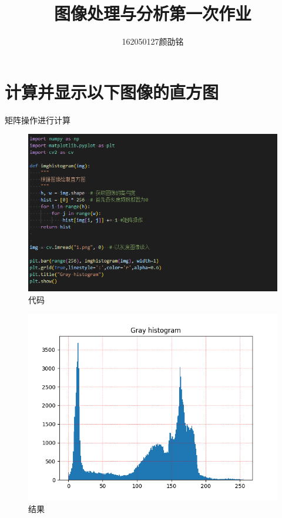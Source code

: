 \documentclass[fontset=windows]{article}
\title{图像处理与分析第一次作业}
\author{162050127颜劭铭}
\date{\zhtoday}
\begin{document}
\maketitle

    \section{计算并显示以下图像的直方图}

        矩阵操作进行计算

        \begin{figure}[H]
            \centering
            \includegraphics[scale=0.35]{code1.png}
            \caption{代码}
        \end{figure}

        \begin{figure}[H]
            \centering
            \includegraphics[scale=0.45]{Gray_histogram.png}
            \caption{结果}
        \end{figure}
\end{document}
